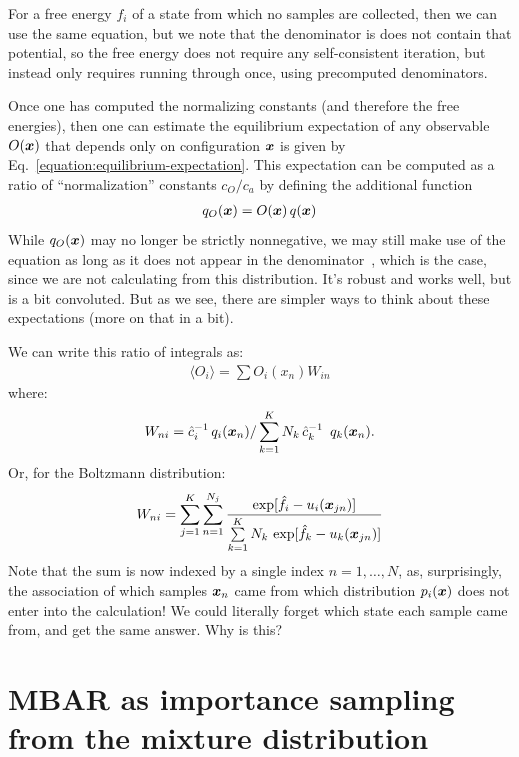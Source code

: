 \documentclass[aps,pre,twocolumn,superscriptaddress]{revtex4-1}
\newcommand{\bfv}[1]{{\mbox{\boldmath{$#1$}}}}
\newcommand{\x}{\bfv{x}}
\begin{document}
For a free energy $f_i$ of a state from which no samples are collected,
then we can use the same equation, but we note that the denominator is
does not contain that potential, so the free energy does not require
any self-consistent iteration, but instead only requires running
through once, using precomputed denominators.

Once one has computed the normalizing constants (and therefore the free
energies), then one can estimate the equilibrium expectation of any
observable $O(\x)$ that depends only on configuration $\x$ is given by
Eq.~\ref{equation:equilibrium-expectation}. This expectation can be
computed as a ratio of ``normalization'' constants $c_O/c_a$ by
defining the additional function
\begin{eqnarray}
q_O(\x) = O(\x) \, q(\x) 
\end{eqnarray}
While $q_O(\x)$ may no longer be strictly nonnegative, we may still
make use of the equation as long as it does not appear in the
denominator~\cite{doss:2003}, which is the case, since we are not
calculating from this distribution. It's robust and works well, but is
a bit convoluted.  But as we see, there are simpler ways to think
about these expectations (more on that in a bit).

We can write this ratio of integrals as:
\begin{eqnarray}
\langle O_i \rangle = \sum O_i(x_n) W_{in} 
\end{eqnarray}
where:
\begin{eqnarray}
W_{ni} = \hat{c}_i^{-1} \, q_i(\x_n) / \sum\limits_{k=1}^K N_k \, \hat{c}_k^{-1} \,\ q_k(\x_n) \label{equation:p_weights} .
\end{eqnarray}
Or, for the Boltzmann distribution:
\begin{eqnarray}
W_{ni} = \sum_{j=1}^K \sum_{n=1}^{N_j} \frac{\exp[\hat{f}_i-u_i(\x_{jn})]}{\sum\limits_{k=1}^K N_k \, \exp[\hat{f}_k - u_k(\x_{jn})]}
\end{eqnarray}
Note that the sum is now indexed by a single index $n = 1,\ldots,N$,
as, surprisingly, the association of which samples $\x_n$ came from
which distribution $p_i(\x)$ does not enter into the calculation!  We
could literally forget which state each sample came from, and get the
same answer.  Why is this?

\section{MBAR as importance sampling from the mixture distribution}
\end{document}
